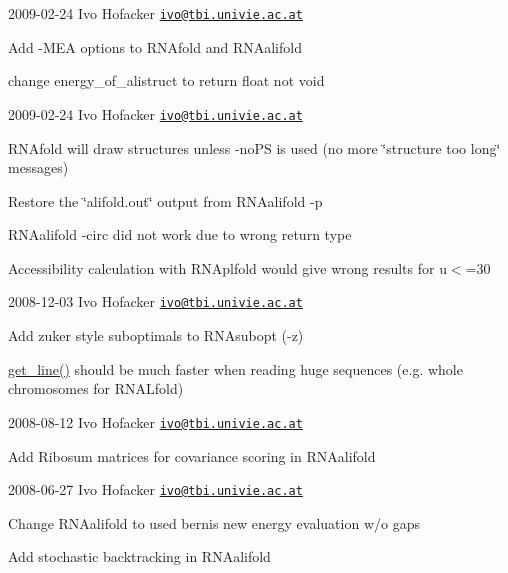 2009-\/02-\/24 Ivo Hofacker \href{mailto:ivo@tbi.univie.ac.at}{\tt ivo@tbi.\+univie.\+ac.\+at}


\begin{DoxyItemize}
\item Add -\/\+M\+EA options to R\+N\+Afold and R\+N\+Aalifold
\item change energy\+\_\+of\+\_\+alistruct to return float not void
\end{DoxyItemize}

2009-\/02-\/24 Ivo Hofacker \href{mailto:ivo@tbi.univie.ac.at}{\tt ivo@tbi.\+univie.\+ac.\+at}


\begin{DoxyItemize}
\item R\+N\+Afold will draw structures unless -\/no\+PS is used (no more \char`\"{}structure too long\char`\"{} messages)
\item Restore the \char`\"{}alifold.\+out\char`\"{} output from R\+N\+Aalifold -\/p
\item R\+N\+Aalifold -\/circ did not work due to wrong return type
\item Accessibility calculation with R\+N\+Aplfold would give wrong results for u$<$=30
\end{DoxyItemize}

2008-\/12-\/03 Ivo Hofacker \href{mailto:ivo@tbi.univie.ac.at}{\tt ivo@tbi.\+univie.\+ac.\+at}


\begin{DoxyItemize}
\item Add zuker style suboptimals to R\+N\+Asubopt (-\/z)
\item \mbox{\hyperlink{utils_8h_abe51806d14cff0789a8c1df7dbc45b71}{get\+\_\+line()}} should be much faster when reading huge sequences (e.\+g. whole chromosomes for R\+N\+A\+Lfold)
\end{DoxyItemize}

2008-\/08-\/12 Ivo Hofacker \href{mailto:ivo@tbi.univie.ac.at}{\tt ivo@tbi.\+univie.\+ac.\+at}


\begin{DoxyItemize}
\item Add Ribosum matrices for covariance scoring in R\+N\+Aalifold
\end{DoxyItemize}

2008-\/06-\/27 Ivo Hofacker \href{mailto:ivo@tbi.univie.ac.at}{\tt ivo@tbi.\+univie.\+ac.\+at}


\begin{DoxyItemize}
\item Change R\+N\+Aalifold to used berni\textquotesingle{}s new energy evaluation w/o gaps
\item Add stochastic backtracking in R\+N\+Aalifold
\end{DoxyItemize}

